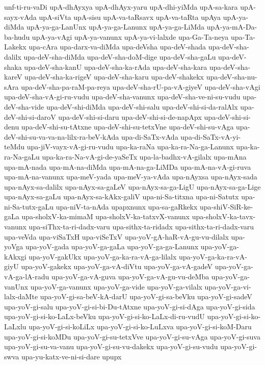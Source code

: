 {unf-ti-ru-vaDi
upA-dhAyxya
upA-dhAyx-yaru
upA-dhi-yiMda
upA-sa-kara
upA-sayx-vAda
upA-siVta
upA-sisu
upA-va-taRsavx
upA-va-taRta
upAya
upA-ya-diMda
upA-ya-ga-LanUnx
upA-ya-ga-Lanunx
upA-ya-ga-LiMda
upA-ya-mA-Da-ba-hudu
upA-ya-vAgi
upA-ya-vanunx
upA-ya-vi-lalxde
upa-Ga-Ta-neya
upa-Ta-Lakekx
upa-cAra
upa-darx-va-diMda
upa-deVsha
upa-deV-shada
upa-deV-sha-dalilx
upa-deV-sha-diMda
upa-deV-sha-doM-dige
upa-deV-sha-gaLu
upa-deV-shaka
upa-deV-sha-kanU
upa-deV-sha-ka-rAda
upa-deV-sha-kara
upa-deV-sha-kareV
upa-deV-sha-ka-rigeV
upa-deV-sha-karu
upa-deV-shakekx
upa-deV-sha-nu-sAra
upa-deV-sha-pa-raM-pa-reya
upa-deV-sha-rU-pa-vA-giyeV
upa-deV-sha-vAgi
upa-deV-sha-vA-gi-ru-vudu
upa-deV-sha-vanunx
upa-deV-sha-ve-ni-su-vudu
upa-deV-sha-vide
upa-deV-shi-diMda
upa-deV-shi-salu
upa-deV-shi-si-da-ralAlx
upa-deV-shi-si-daroV
upa-deV-shi-si-daru
upa-deV-shi-si-de-napApx
upa-deV-shi-si-denu
upa-deV-shi-su-tAtxne
upa-deV-shi-su-tetxVne
upa-deV-shi-su-vAga
upa-deV-shi-su-va-va-na-lilx-ra-beV-kAda
upa-di-SaTx-vAda
upa-di-SaTx-vA-yi-teMdu
upa-jiV-vayx-vA-gi-ru-vudu
upa-ka-raNa
upa-ka-ra-Na-ga-Lanunx
upa-ka-ra-Na-gaLu
upa-ka-ra-Na-vA-gi-de-yaSeTx
upa-la-badhx-vA-gilalx
upa-mAna
upa-mA-nada
upa-mA-na-diMda
upa-mA-na-ga-LiMDa
upa-mA-na-vA-gi-ruva
upa-mA-na-vanunx
upa-meV-yada
upa-meV-ya-vAda
upa-nAyxsa
upa-nAyx-sada
upa-nAyx-sa-dalilx
upa-nAyx-sa-gaLeV
upa-nAyx-sa-ga-LigU
upa-nAyx-sa-ga-Lige
upa-nAyx-sa-gaLu
upa-nAyx-sa-kAkx-galiV
upa-ni-Sa-titxna
upa-ni-Satutx
upa-ni-Sa-tutx-gaLu
upa-niV-ta-nAda
upapxnunx
upa-sa-gaRkekx
upa-shiV-SiR-ke-gaLa
upa-sholxV-ka-mimaM
upa-sholxV-ka-tatxvX-vanunx
upa-sholxV-ka-tavx-vanunx
upa-siThx-ta-ri-dadx-varu
upa-sithx-ta-ridadx
upa-sithx-ta-ri-dadx-varu
upa-veVda
upa-viSaTxH
upa-viSeTxV
upa-yoV-gA-haR-vA-gu-vu-dilalx
upa-yoVga
upa-yoV-gada
upa-yoV-ga-gaLa
upa-yoV-ga-ga-Lanunx
upa-yoV-ga-kAkxgi
upa-yoV-gakUkx
upa-yoV-ga-ka-ra-vA-ga-lilalx
upa-yoV-ga-ka-ra-vA-giyU
upa-yoV-gakekx
upa-yoV-ga-vA-diVtu
upa-yoV-ga-vA-gadeV
upa-yoV-ga-vA-ga-lA-radu
upa-yoV-ga-vA-guva
upa-yoV-ga-vA-gu-vu-deMba
upa-yoV-ga-vanUnx
upa-yoV-ga-vanunx
upa-yoV-ga-vide
upa-yoV-ga-vilalx
upa-yoV-ga-vi-lalx-daMte
upa-yoV-gi-sa-beV-kA-darU
upa-yoV-gi-sa-beVku
upa-yoV-gi-sadeV
upa-yoV-gi-salu
upa-yoV-gi-si-bi-Du-tAtxne
upa-yoV-gi-si-dAga
upa-yoV-gi-sida
upa-yoV-gi-si-ko-LaLx-beVku
upa-yoV-gi-si-ko-LaLx-di-ru-vudU
upa-yoV-gi-si-ko-LaLxlu
upa-yoV-gi-si-koLiLx
upa-yoV-gi-si-ko-LuLxva
upa-yoV-gi-si-koM-Daru
upa-yoV-gi-si-koMDu
upa-yoV-gi-su-tetxVve
upa-yoV-gi-su-vAga
upa-yoV-gi-suva
upa-yoV-gi-su-va-vanu
upa-yoV-gi-su-vu-dakekx
upa-yoV-gi-su-vudu
upa-yoV-gi-swva
upa-yu-katx-ve-ni-si-dare
upupx
}
